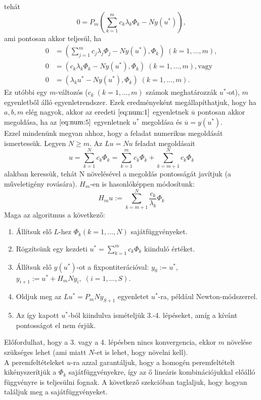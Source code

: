 \documentclass[oneside, titlepage, 12pt, a4paper]{report}
\begin{document}
tehát
\begin{equation*}
0 = P_m (\sum_{k = 1}^m c_k \lambda_k \Phi_k - N y(u^*)),
\end{equation*}
ami pontosan akkor teljesül, ha
\begin{align}
0 &= (\sum_{j = 1}^m c_j \lambda_j \Phi_j - N y(u^*), \Phi_k) \; (k = 1, \dots, m), \nonumber \\
0 &= (c_k \lambda_k \Phi_k - N y(u^*), \Phi_k) \; (k = 1, \dots, m), \text{vagy} \nonumber \\
0 &= (\lambda_k u^* - N y(u^*), \Phi_k) \; (k = 1, \dots, m). \label{eq:num:5}
\end{align}
Ez utóbbi egy $m$-változós ($c_k \; (k = 1, \dots, m)$ számok meghatározzák $u^*$-ot), $m$ egyenletből álló egyenletrendszer. Ezek eredményeként megállapíthatjuk, hogy ha $a, b, m$ elég nagyok, akkor az eredeti $\eqref{eq:num:1}$ egyenletnek $\overline{u}$ pontosan akkor megoldása, ha az $\eqref{eq:num:5}$ egyenletnek $u^*$ megoldása és $\overline{u} = y(u^*)$. \\
Ezzel mindenünk megvan ahhoz, hogy a feladat numerikus megoldását ismertessük. Legyen $N \geq m$. Az $Lu = Nu$ feladat megoldásait
\begin{equation*}
u = \sum_{k = 1}^N c_k \Phi_k = \sum_{k = 1}^m c_k \Phi_k + \sum_{k = m+1}^N c_k \Phi_k
\end{equation*}
alakban keressük, tehát N növelésével a megoldás pontosságát javítjuk (a műveletigény rovására). $H_m$-en is hasonlóképpen módosítunk:
\begin{equation*}
H_m u := \sum_{k = m+1}^N \frac{c_k}{\lambda_k} \Phi_k
\end{equation*}
Maga az algoritmus a következő:
\begin{enumerate}
\item Állítsuk elő $L$-hez $\Phi_k (k = 1, \dots, N)$ sajátfüggvényeket.
\item Rögzítsünk egy kezdeti $u^* = \sum_{k = 1}^m c_k \Phi_k$ kiinduló értéket.
\item Állítsuk elő $y(u^*)$-ot a fixpontiterációval: $y_0 := u^*$, $y_{i+1} := u^* + H_m N y_i, \; (i = 1, \dots, S)$.
\item Oldjuk meg az $Lu^* = P_m N y_{S+1}$ egyenletet $u^*$-ra, például Newton-módszerrel.
\item Az így kapott $u^*$-ból kiindulva ismételjük 3.-4. lépéseket, amíg a kívánt pontosságot el nem érjük.
\end{enumerate}
Előfordulhat, hogy a 3. vagy a 4. lépésben nincs konvergencia, ekkor $m$ növelése szükséges lehet (ami miatt $N$-et is lehet, hogy növelni kell). \\
A peremfeltételeket $u$-ra azzal garantáljuk, hogy a homogén peremfeltételt kikényszerítjük a $\Phi_k$ sajátfüggvényekre, így az ő lineáris kombinációjukkal előálló függvényre is teljesülni fognak. A következő szekcióban taglaljuk, hogy hogyan találjuk meg a sajátfüggvényeket.
\end{document}
